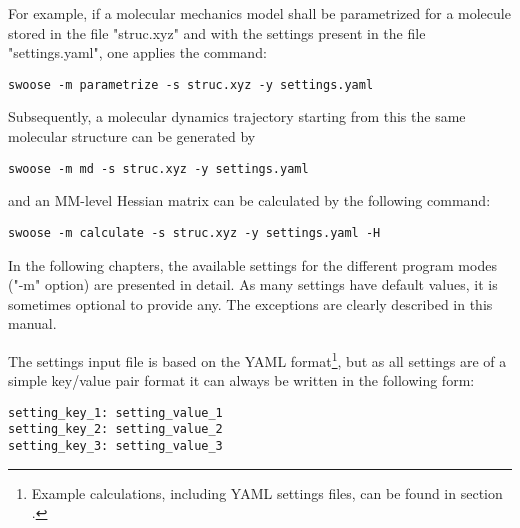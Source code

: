 \documentclass[]{tufte-book}
\begin{document}
For example, if a molecular mechanics model shall be parametrized for a molecule stored in the file "struc.xyz" and with the settings present in the file "settings.yaml", one applies the command:
\begin{mdframed}[backgroundcolor=LightSteelBlue!25, linewidth=0pt]
\begin{verbatim}
swoose -m parametrize -s struc.xyz -y settings.yaml
\end{verbatim}
\end{mdframed}
Subsequently, a molecular dynamics trajectory starting from this the same molecular structure can be generated by
\begin{mdframed}[backgroundcolor=LightSteelBlue!25, linewidth=0pt]
\begin{verbatim}
swoose -m md -s struc.xyz -y settings.yaml
\end{verbatim}
\end{mdframed}
and an MM-level Hessian matrix can be calculated by the following command:
\begin{mdframed}[backgroundcolor=LightSteelBlue!25, linewidth=0pt]
\begin{verbatim}
swoose -m calculate -s struc.xyz -y settings.yaml -H
\end{verbatim}
\end{mdframed}
In the following chapters, the available settings for the different program modes ("-m" option) are presented in detail. As many settings have default values, it is sometimes optional to provide any. The exceptions are clearly described in this manual.


\newpage
The settings input file is based on the YAML format\footnote{Example calculations, including YAML settings files, can be found in section .}, but as all settings are of a simple
key/value pair format it can always be written in the following form:
\begin{mdframed}[backgroundcolor=LightSteelBlue!25, linewidth=0pt]
\begin{verbatim}
setting_key_1: setting_value_1
setting_key_2: setting_value_2
setting_key_3: setting_value_3
\end{verbatim}
\end{mdframed}

\vspace*{0.75cm}
\end{document}
